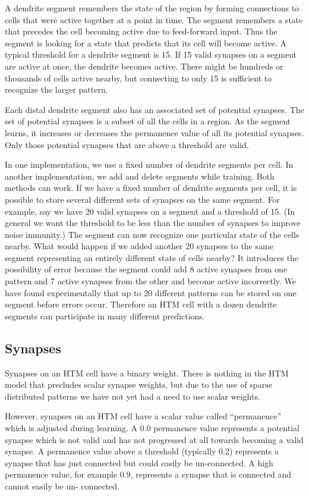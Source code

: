 A dendrite segment remembers the state of the region by forming
connections to cells that were active together at a point in time. The
segment remembers a state that precedes the cell becoming active due
to feed-forward input. Thus the segment is looking for a state that
predicts that its cell will become active. A typical threshold for a
dendrite segment is 15. If 15 valid synapses on a segment are active
at once, the dendrite becomes active. There might be hundreds or
thousands of cells active nearby, but connecting to only 15 is
sufficient to recognize the larger pattern.

Each distal dendrite segment also has an associated set of potential
synapses. The set of potential synapses is a subset of all the cells
in a region. As the segment learns, it increases or decreases the
permanence value of all its potential synapses. Only those potential
synapses that are above a threshold are valid.

In one implementation, we use a fixed number of dendrite segments per
cell. In another implementation, we add and delete segments while
training. Both methods can work. If we have a fixed number of dendrite
segments per cell, it is possible to store several different sets of
synapses on the same segment. For example, say we have 20 valid
synapses on a segment and a threshold of 15. (In general we want the
threshold to be less than the number of synapses to improve noise
immunity.) The segment can now recognize one particular state of the
cells nearby. What would happen if we added another 20 synapses to the
same segment representing an entirely different state of cells nearby?
It introduces the possibility of error because the segment could add 8
active synapses from one pattern and 7 active synapses from the other
and become active incorrectly. We have found experimentally that up to
20 different patterns can be stored on one segment before errors
occur. Therefore an HTM cell with a dozen dendrite segments can
participate in many different predictions.

\subsection*{Synapses}

Synapses on an HTM cell have a binary weight. There is nothing in the
HTM model that precludes scalar synapse weights, but due to the use of
sparse distributed patterns we have not yet had a need to use scalar
weights.

However, synapses on an HTM cell have a scalar value called
``permanence'' which is adjusted during learning. A 0.0 permanence value
represents a potential synapse which is not valid and has not
progressed at all towards becoming a valid synapse. A permanence value
above a threshold (typically 0.2) represents a synapse that has just
connected but could easily be un-connected. A high permanence value,
for example 0.9, represents a synapse that is connected and cannot
easily be un- connected.

